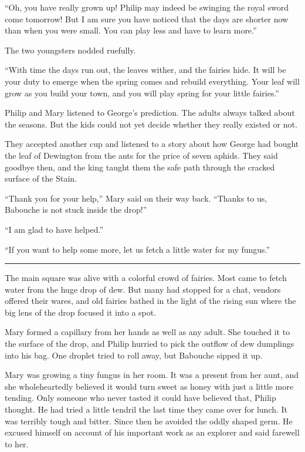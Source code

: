\documentclass[10pt]{memoir}
\renewcommand{\pfbreakdisplay}{\bigskip \ding{166} \bigskip}
\newcommand{\secbreak}{\fancybreak{\pfbreakdisplay}}
\begin{document}
``Oh, you have really grown up! Philip may indeed be swinging the royal sword
come tomorrow! But I am sure you have noticed that the days are shorter now
than when you were small. You can play less and have to learn more.''

The two youngsters nodded ruefully.

``With time the days run out, the leaves wither, and the fairies hide. It will
be your duty to emerge when the spring comes and rebuild everything. Your leaf
will grow as you build your town, and you will play spring for your little
fairies.''

Philip and Mary listened to George's prediction. The adults always talked about
the seasons. But the kids could not yet decide whether they really existed or
not.

They accepted another cup and listened to a story about how George had bought
the leaf of Dewington from the ants for the price of seven aphids. They said
goodbye then, and the king taught them the safe path through the cracked
surface of the Stain.

``Thank you for your help,'' Mary said on their way back. ``Thanks to us,
Babouche is not stuck inside the drop!''

``I am glad to have helped.''

``If you want to help some more, let us fetch a little water for my fungus.''

\secbreak

The main square was alive with a colorful crowd of fairies. Most came to fetch
water from the huge drop of dew. But many had stopped for a chat, vendors
offered their wares, and old fairies bathed in the light of the rising sun
where the big lens of the drop focused it into a spot.

Mary formed a capillary from her hands as well as any adult. She touched it to
the surface of the drop, and Philip hurried to pick the outflow of dew
dumplings into his bag. One droplet tried to roll away, but Babouche sipped it
up.

Mary was growing a tiny fungus in her room. It was a present from her aunt, and
she wholeheartedly believed it would turn sweet as honey with just a little
more tending. Only someone who never tasted it could have believed that, Philip
thought. He had tried a little tendril the last time they came over for lunch.
It was terribly tough and bitter. Since then he avoided the oddly shaped germ.
He excused himself on account of his important work as an explorer and said
farewell to her.
\end{document}
